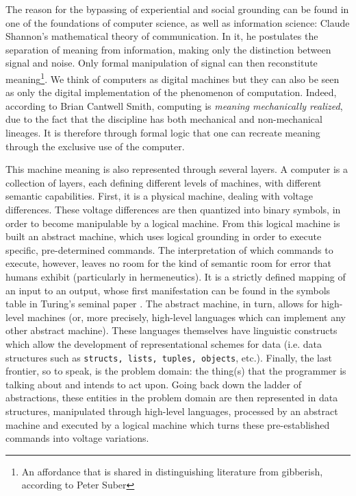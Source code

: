 The reason for the bypassing of experiential and social grounding can be found in one of the foundations of computer science, as well as information science: Claude Shannon's mathematical theory of communication. In it, he postulates the separation of meaning from information, making only the distinction between signal and noise. Only formal manipulation of signal can then reconstitute meaning\footnote{An affordance that is shared in distinguishing literature from gibberish, according to Peter Suber\citep{suber_what_1988}}. We think of computers as digital machines but they can also be seen as only the digital implementation of the phenomenon of computation. Indeed, according to Brian Cantwell Smith, computing is \emph{meaning mechanically realized}, due to the fact that the discipline has both mechanical and non-mechanical lineages\citep{smith_aos_2016}. It is therefore through formal logic that one can recreate meaning through the exclusive use of the computer. 

This machine meaning is also represented through several layers. A computer is a collection of layers, each defining different levels of machines, with different semantic capabilities. First, it is a physical machine, dealing with voltage differences. These voltage differences are then quantized into binary symbols, in order to become manipulable by a logical machine. From this logical machine is built an abstract machine, which uses logical grounding in order to execute specific, pre-determined commands. The interpretation of which commands to execute, however, leaves no room for the kind of semantic room for error that humans exhibit (particularly in hermeneutics). It is a strictly defined mapping of an input to an output, whose first manifestation can be found in the symbols table in Turing's seminal paper \citep{turing_computable_1936}. The abstract machine, in turn, allows for high-level machines (or, more precisely, high-level languages which can implement any other abstract machine). These languages themselves have linguistic constructs which allow the development of representational schemes for data (i.e. data structures such as \lstinline{structs, lists, tuples, objects}, etc.). Finally, the last frontier, so to speak, is the problem domain: the thing(s) that the programmer is talking about and intends to act upon. Going back down the ladder of abstractions, these entities in the problem domain are then represented in data structures, manipulated through high-level languages, processed by an abstract machine and executed by a logical machine which turns these pre-established commands into voltage variations.

